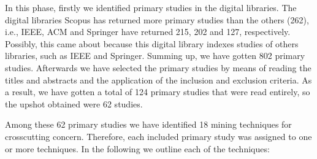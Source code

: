 %

In this phase, firstly we identified primary studies in the digital libraries. The digital libraries Scopus has returned more primary studies than the others (262), i.e., IEEE, ACM and Springer have returned 215, 202 and 127, respectively. Possibly, this came about because this digital library indexes studies of others libraries, such as IEEE and Springer. Summing up, we have gotten 802 primary studies. Afterwards we have selected the primary studies by means of reading the titles and abstracts and the application of the inclusion and exclusion criteria. As a result, we have gotten a total of 124 primary studies that were read entirely, so the upshot obtained were 62 studies. 

Among these 62 primary studies we have identified 18 mining techniques for crosscutting concern. Therefore, each included primary study was assigned to one or more techniques. In the following we outline each of the techniques: 

